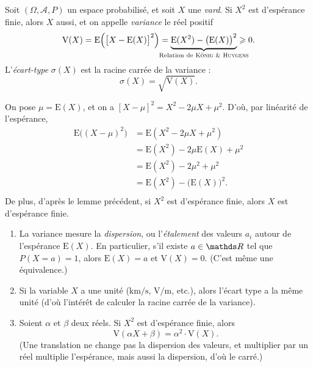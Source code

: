 \begin{prop-defn}
  Soit $(\Omega, \mathcal{A}, P)$\/ un espace probabilisé, et soit $X$\/ une \textit{vard}. Si $X^2$\/ est d'espérance finie, alors $X$\/ aussi, et on appelle \textit{variance} le réel positif \[
    \mathrm{V}(X) = \mathrm{E}\Big(\big[X - \mathrm{E}(X)\big]^2\Big) = \underbrace{\mathrm{E}(X^2) - \big(\mathrm{E}(X)\big)^2}_{\mathclap{\text{Relation de \textsc{König \& Huygens}}}} \ge 0
  .\]
  L'\textit{écart-type} $\sigma(X)$\/ est la racine carrée de la variance : \[
    \sigma(X) = \sqrt{\mathrm{V}(X)}
  .\]
\end{prop-defn}

\begin{prv}
  On pose $\mu = \mathrm{E}(X)$, et on a $[X - \mu]^2 = X^2 - 2 \mu X + \mu^2$. D'où, par linéarité de l'espérance,
  \begin{align*}
    \mathrm{E}\big((X-\mu)^2\big)
    &= \mathrm{E}(X^2 - 2\mu X + \mu^2) \\
    &= \mathrm{E}(X^2) - 2\mu \mathrm{E}(X) + \mu^2 \\
    &= \mathrm{E}(X^2) - 2\mu^2 + \mu^2 \\
    &= \mathrm{E}(X^2) - \big(\mathrm{E}(X)\big)^2. \\
  \end{align*}
  De plus, d'après le lemme précédent, si $X^2$\/ est d'espérance finie, alors $X$\/ est d'espérance finie.
\end{prv}

\begin{rmk}
  \begin{enumerate}
    \item La variance mesure la \textit{dispersion}, ou l'\textit{étalement} des valeurs $a_i$\/ autour de l'espérance $\mathrm{E}(X)$. En particulier, s'il existe $a \in \R$\/ tel que $P(X = a) = 1$, alors $\mathrm{E}(X) = a$\/ et $\mathrm{V}(X) = 0$. (C'est même une équivalence.)
    \item Si la variable $X$\/ a une unité ($\mathrm{km}/\mathrm{s}$, $\mathrm{V}/\mathrm{m}$, etc.), alors l'écart type a la même unité (d'où l'intérêt de calculer la racine carrée de la variance).
    \item Soient $\alpha$\/ et $\beta$\/ deux réels. Si  $X^2$\/ est d'espérance finie, alors \[
      \mathrm{V}(\alpha X + \beta) = \alpha^2\cdot  \mathrm{V}(X)
    .\]
    (Une translation ne change pas la dispersion des valeurs, et multiplier par un réel multiplie l'espérance, mais aussi la dispersion, d'où le carré.)
  \end{enumerate}
\end{rmk}

